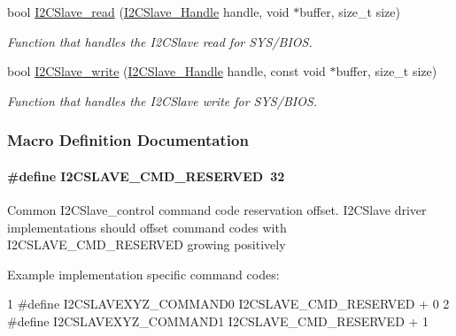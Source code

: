 \begin{DoxyCompactItemize}
bool \hyperlink{_i2_c_slave_8h_ad5409f453e769676593a1a14d0ba6d7b}{I2\+C\+Slave\+\_\+read} (\hyperlink{_i2_c_slave_8h_a302d775f802ff66ed2ca05e1956f738e}{I2\+C\+Slave\+\_\+\+Handle} handle, void $\ast$buffer, size\+\_\+t size)
\begin{DoxyCompactList}\small\item\em Function that handles the I2\+C\+Slave read for S\+Y\+S/\+B\+I\+O\+S. \end{DoxyCompactList}\item 
bool \hyperlink{_i2_c_slave_8h_a66c5d4103e022318c746c592ab2295f8}{I2\+C\+Slave\+\_\+write} (\hyperlink{_i2_c_slave_8h_a302d775f802ff66ed2ca05e1956f738e}{I2\+C\+Slave\+\_\+\+Handle} handle, const void $\ast$buffer, size\+\_\+t size)
\begin{DoxyCompactList}\small\item\em Function that handles the I2\+C\+Slave write for S\+Y\+S/\+B\+I\+O\+S. \end{DoxyCompactList}\end{DoxyCompactItemize}


\subsubsection{Macro Definition Documentation}
\paragraph[{I2\+C\+S\+L\+A\+V\+E\+\_\+\+C\+M\+D\+\_\+\+R\+E\+S\+E\+R\+V\+E\+D}]{\setlength{\rightskip}{0pt plus 5cm}\#define I2\+C\+S\+L\+A\+V\+E\+\_\+\+C\+M\+D\+\_\+\+R\+E\+S\+E\+R\+V\+E\+D~32}\label{_i2_c_slave_8h_a50e2b786948f487d4cb975e5581d93df}
Common I2\+C\+Slave\+\_\+control command code reservation offset. I2\+C\+Slave driver implementations should offset command codes with I2\+C\+S\+L\+A\+V\+E\+\_\+\+C\+M\+D\+\_\+\+R\+E\+S\+E\+R\+V\+E\+D growing positively

Example implementation specific command codes\+: 
\begin{DoxyCode}
1 #define I2CSLAVEXYZ\_COMMAND0          I2CSLAVE\_CMD\_RESERVED + 0
2 #define I2CSLAVEXYZ\_COMMAND1          I2CSLAVE\_CMD\_RESERVED + 1
\end{DoxyCode}
